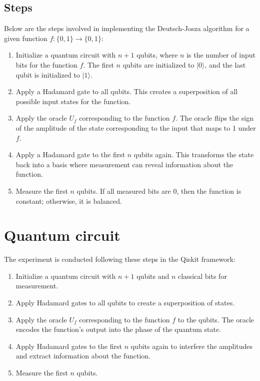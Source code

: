 \documentclass[12pt]{article}
\begin{document}
\subsection{Steps}
Below are the steps involved in implementing the Deutsch-Josza algorithm for a given function \( f: \{0, 1\} \rightarrow \{0, 1\} \):
\begin{enumerate}
    \item Initialize a quantum circuit with \( n + 1 \) qubits, where \( n \) is the number of input bits for the function \( f \). The first \( n \) qubits are initialized to \( |0\rangle \), and the last qubit is initialized to \( |1\rangle \).
    \item Apply a Hadamard gate to all qubits. This creates a superposition of all possible input states for the function.
    \item Apply the oracle \( U_f \) corresponding to the function \( f \). The oracle flips the sign of the amplitude of the state corresponding to the input that maps to 1 under \( f \).
    \item Apply a Hadamard gate to the first \( n \) qubits again. This transforms the state back into a basis where measurement can reveal information about the function.
    \item Measure the first \( n \) qubits. If all measured bits are 0, then the function is constant; otherwise, it is balanced.
\end{enumerate}


\section{Quantum circuit}
The experiment is conducted following these steps in the Qiskit framework:
\begin{enumerate}
    \item Initialize a quantum circuit with \( n + 1 \) qubits and \( n \) classical bits for measurement.
    \item Apply Hadamard gates to all qubits to create a superposition of states.
    \item Apply the oracle \( U_f \) corresponding to the function \( f \) to the qubits. The oracle encodes the function's output into the phase of the quantum state.
    \item Apply Hadamard gates to the first \( n \) qubits again to interfere the amplitudes and extract information about the function.
    \item Measure the first \( n \) qubits.
\end{enumerate}
\end{document}
